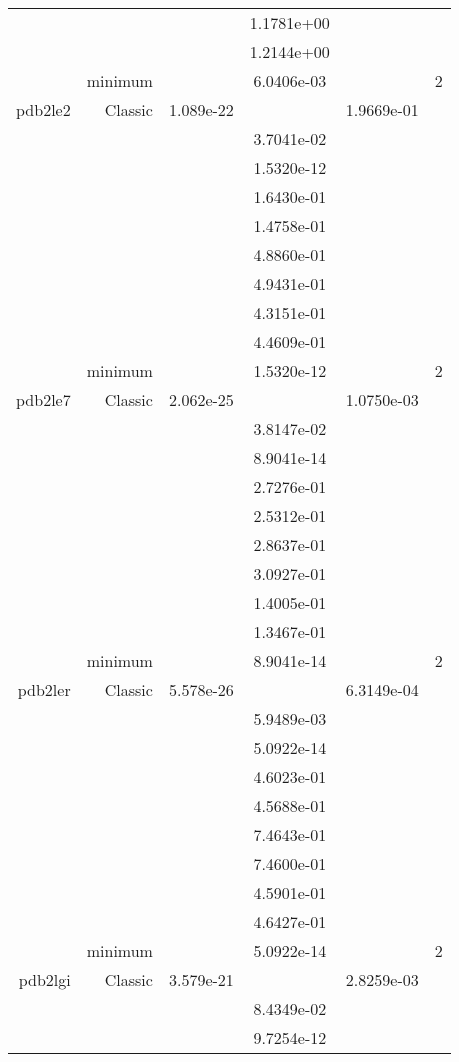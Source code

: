 \begin{xltabular}{\textwidth}{r|rS[table-format=1.3e+2]S[table-format=1.4e+2]S[table-format=1.4e+2]S[table-format=-1.5]}
&  &  & 1.1781e+00 & & \\
&  &  & 1.2144e+00 & & \\
& minimum &  & 6.0406e-03 & & 2 \\  \addlinespace
pdb2le2 & Classic & 1.089e-22 &  & 1.9669e-01 & \\
&  &  & 3.7041e-02 & & \\
&  &  & 1.5320e-12 & & \\
&  &  & 1.6430e-01 & & \\
&  &  & 1.4758e-01 & & \\
&  &  & 4.8860e-01 & & \\
&  &  & 4.9431e-01 & & \\
&  &  & 4.3151e-01 & & \\
&  &  & 4.4609e-01 & & \\
& minimum &  & 1.5320e-12 & & 2 \\  \addlinespace
pdb2le7 & Classic & 2.062e-25 &  & 1.0750e-03 & \\
&  &  & 3.8147e-02 & & \\
&  &  & 8.9041e-14 & & \\
&  &  & 2.7276e-01 & & \\
&  &  & 2.5312e-01 & & \\
&  &  & 2.8637e-01 & & \\
&  &  & 3.0927e-01 & & \\
&  &  & 1.4005e-01 & & \\
&  &  & 1.3467e-01 & & \\
& minimum &  & 8.9041e-14 & & 2 \\  \addlinespace
pdb2ler & Classic & 5.578e-26 &  & 6.3149e-04 & \\
&  &  & 5.9489e-03 & & \\
&  &  & 5.0922e-14 & & \\
&  &  & 4.6023e-01 & & \\
&  &  & 4.5688e-01 & & \\
&  &  & 7.4643e-01 & & \\
&  &  & 7.4600e-01 & & \\
&  &  & 4.5901e-01 & & \\
&  &  & 4.6427e-01 & & \\
& minimum &  & 5.0922e-14 & & 2 \\  \addlinespace
pdb2lgi & Classic & 3.579e-21 &  & 2.8259e-03 & \\
&  &  & 8.4349e-02 & & \\
&  &  & 9.7254e-12 & & \\

\end{xltabular}
